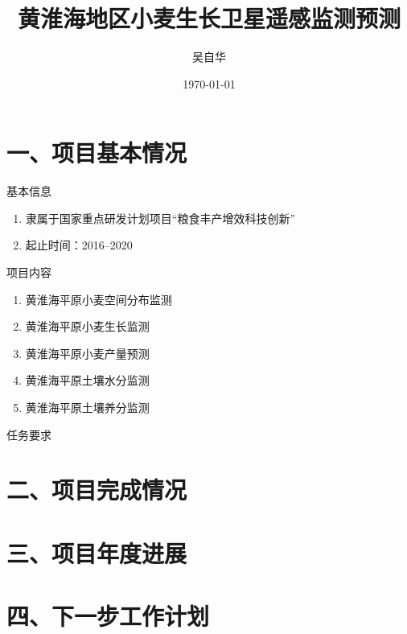 \documentclass{beamer}
\title{黄淮海地区小麦生长卫星遥感监测预测}
\date{\today}
\author{吴自华}
\institute{北京大学}
\begin{document}
  \maketitle
  \section{一、项目基本情况}
  \begin{frame}{基本信息}
    \begin{enumerate}
    	\item 隶属于国家重点研发计划项目“粮食丰产增效科技创新”
    	\item 起止时间：2016--2020
    \end{enumerate}
  \end{frame}
 
\begin{frame}{项目内容}
	\begin{enumerate}
		\item 黄淮海平原小麦空间分布监测
		\item 黄淮海平原小麦生长监测
		\item 黄淮海平原小麦产量预测
		\item 黄淮海平原土壤水分监测
		\item 黄淮海平原土壤养分监测
	\end{enumerate}
\end{frame}

\begin{frame}{任务要求}
	
\end{frame}

\section{二、项目完成情况}
\section{三、项目年度进展}
\section{四、下一步工作计划}
\end{document}
